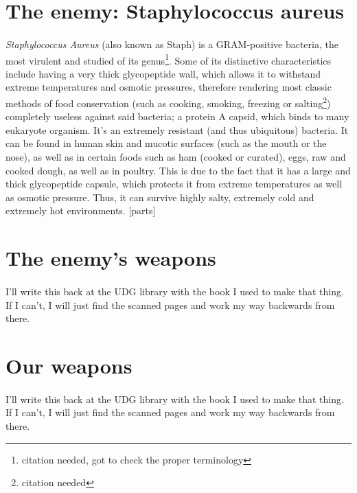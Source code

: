 \section{The enemy: Staphylococcus aureus}
\paragraph{}\emph{Staphylococcus Aureus} (also known as Staph) is a GRAM-positive bacteria, the most virulent and studied of its genus\footnote{citation needed, got to check the proper terminology}. Some of its distinctive characteristics include having a very thick glycopeptide wall, which allows it to withstand extreme temperatures and osmotic pressures, therefore rendering most classic methods of food conservation (such as cooking, smoking, freezing or salting\footnote{citation needed}) completely useless against said bacteria;  a protein A capsid, which binds to many eukaryote organism. It's an extremely resistant (and thus ubiquitous) bacteria. It can be found in human skin and mucotic surfaces (such as the mouth or the nose), as well as in certain foods such as ham (cooked or curated), eggs, raw and cooked dough, as well as in poultry. This is due to the fact that it has a large and thick glycopeptide capsule, which protects it from extreme temperatures as well as osmotic pressure. Thus, it can survive highly salty, extremely cold and extremely hot environments. [parts]
\section{The enemy's weapons}
\paragraph{}I'll write this back at the UDG library with the book  I used to make that thing. If I can't, I will just find the scanned pages and work my way backwards from there.
\section{Our weapons}
\paragraph{}I'll write this back at the UDG library with the book  I used to make that thing. If I can't, I will just find the scanned pages and work my way backwards from there.

